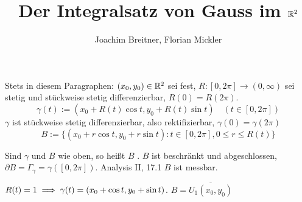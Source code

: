 \documentclass{article}
\title{Der Integralsatz von Gauss im $\mathbb{R}^2$}
\author{Joachim Breitner, Florian Mickler}
\begin{document}
\maketitle

Stets in diesem Paragraphen: $(x_0,y_0) \in \mathbb{R}^2$ sei fest, $R:[0,2\pi] \to (0,\infty)$ sei stetig und stückweise stetig differenzierbar, $R(0) = R(2\pi)$.
\[ \gamma(t) := (x_0 + R(t)\cos t, y_0 + R(t) \sin t) \quad (t\in[0,2\pi]) \]
$\gamma$ ist stückweise stetig differenzierbar, also rektifizierbar, $\gamma(0) = \gamma(2\pi)$
\[ B:= \{ (x_0+r\cos t, y_0+ r\sin t) : t\in[0,2\pi], 0\le r\le R(t) \} \]


Sind $\gamma$ und $B$ wie oben, so heißt $B$ . $B$ ist beschränkt und abgeschlossen, $\partial B = \Gamma_\gamma = \gamma([0,2\pi])$. Analysis II, 17.1 \folgt $B$ ist messbar.

\begin{beispiel}
$R(t) = 1 \implies \gamma(t) = (x_0 + \cos t, y_0 + \sin t)$. $B= \overline{U_1(x_0,y_0)}$
\end{beispiel}
\end{document}
